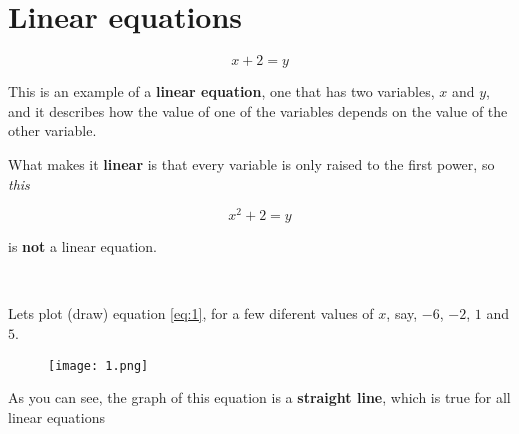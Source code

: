 \documentclass{article}
\begin{document}
\section{Linear equations}

\begin{equation} \label{eq:1}
x + 2 = y 
\end{equation}

This is an example of a \textbf{linear equation}, one that has two variables, $x$ and $y$, and it describes how the value of one of the variables depends on the value of the other variable. 

What makes it \textbf{linear} is that every variable is only raised to the first power, so \textit{this}

\[
x^2 + 2 = y
\]

is \textbf{not} a linear equation.

\


Lets plot (draw) equation \eqref{eq:1},  for a few diferent values of $x$, say, $-6$, $-2$, $1$ and $5$.



\begin{figure}[h]
\centering
\texttt{[image: 1.png]}
\end{figure}

As you can see, the graph of this equation is a \textbf{straight line}, which is true for all linear equations
\end{document}
